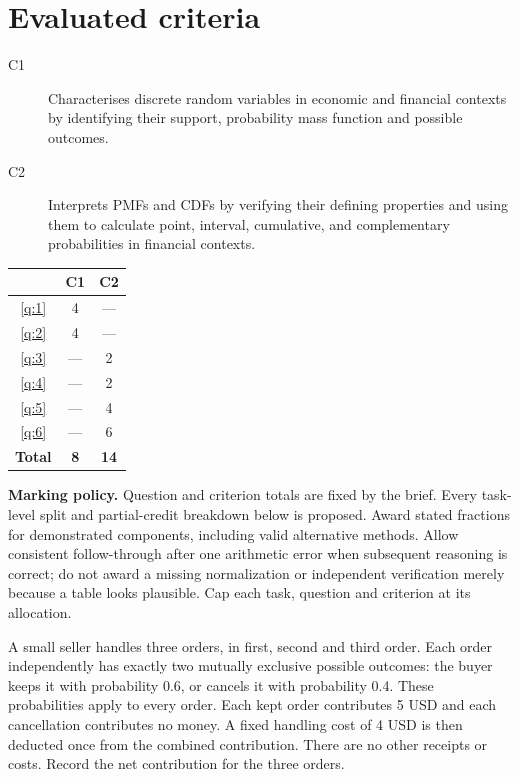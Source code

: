 \section*{Evaluated criteria}
\begin{description}
\item[C1] Characterises discrete random variables in economic and financial contexts by identifying their support, probability mass function and possible outcomes.
\item[C2] Interprets PMFs and CDFs by verifying their defining properties and using them to calculate point, interval, cumulative, and complementary probabilities in financial contexts.
\end{description}


\begin{center}
\begin{tabular}{|c|c|c|}
	\hline\textbf{\textnumero} & \textbf{C1} & \textbf{C2} \\ \hline
	\ref*{q:1} & 4 & --- \\\hline
	\ref*{q:2} & 4 & --- \\\hline
	\ref*{q:3} & --- & 2 \\\hline
	\ref*{q:4} & --- & 2 \\\hline
	\ref*{q:5} & --- & 4 \\\hline
	\ref*{q:6} & --- & 6 \\\hline
	\textbf{Total} & \textbf{8} & \textbf{14} \\\hline
\end{tabular}
\end{center}


\textbf{Marking policy.} Question and criterion totals are fixed by the brief. Every task-level split and partial-credit breakdown below is proposed. Award stated fractions for demonstrated components, including valid alternative methods. Allow consistent follow-through after one arithmetic error when subsequent reasoning is correct; do not award a missing normalization or independent verification merely because a table looks plausible. Cap each task, question and criterion at its allocation.

\clearpage
{}

A small seller handles three orders, in first, second and third order. Each order independently has exactly two mutually exclusive possible outcomes: the buyer keeps it with probability 0.6, or cancels it with probability 0.4. These probabilities apply to every order. Each kept order contributes 5 USD and each cancellation contributes no money. A fixed handling cost of 4 USD is then deducted once from the combined contribution. There are no other receipts or costs. Record the net contribution for the three orders.

